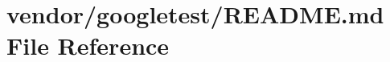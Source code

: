 \hypertarget{vendor_2googletest_2readme_8md}{}\section{vendor/googletest/\+R\+E\+A\+D\+ME.md File Reference}
\label{vendor_2googletest_2readme_8md}
